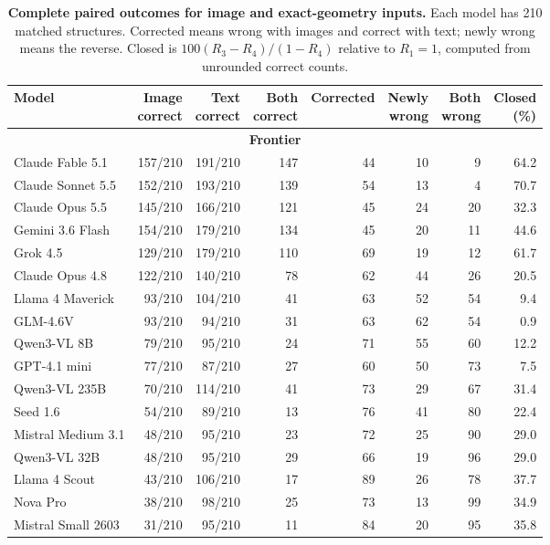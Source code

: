 \begin{table}[t]
\centering
\caption{\textbf{Complete paired outcomes for image and exact-geometry inputs.} Each model has 210 matched structures. Corrected means wrong with images and correct with text; newly wrong means the reverse. Closed is $100(R_3-R_4)/(1-R_4)$ relative to $R_1=1$, computed from unrounded correct counts.}
\label{tab:vlm_paired_counts}
\small
\setlength{\tabcolsep}{4pt}
\renewcommand{\arraystretch}{1.08}
\begin{tabular*}{\textwidth}{@{\extracolsep{\fill}}lrrrrrrr@{}}
\toprule
Model & \shortstack{Image\\correct} & \shortstack{Text\\correct} & \shortstack{Both\\correct} & Corrected & \shortstack{Newly\\wrong} & \shortstack{Both\\wrong} & \shortstack{Closed\\(\%)}\\
\midrule
\multicolumn{8}{c}{\textbf{Frontier}}\\
\midrule
Claude Fable 5.1 & 157/210 & 191/210 & 147 & 44 & 10 & 9 & 64.2\\
Claude Sonnet 5.5 & 152/210 & 193/210 & 139 & 54 & 13 & 4 & 70.7\\
Claude Opus 5.5 & 145/210 & 166/210 & 121 & 45 & 24 & 20 & 32.3\\
\midrule
Gemini 3.6 Flash & 154/210 & 179/210 & 134 & 45 & 20 & 11 & 44.6\\
Grok 4.5 & 129/210 & 179/210 & 110 & 69 & 19 & 12 & 61.7\\
Claude Opus 4.8 & 122/210 & 140/210 & 78 & 62 & 44 & 26 & 20.5\\
Llama 4 Maverick & 93/210 & 104/210 & 41 & 63 & 52 & 54 & 9.4\\
GLM-4.6V & 93/210 & 94/210 & 31 & 63 & 62 & 54 & 0.9\\
Qwen3-VL 8B & 79/210 & 95/210 & 24 & 71 & 55 & 60 & 12.2\\
GPT-4.1 mini & 77/210 & 87/210 & 27 & 60 & 50 & 73 & 7.5\\
Qwen3-VL 235B & 70/210 & 114/210 & 41 & 73 & 29 & 67 & 31.4\\
Seed 1.6 & 54/210 & 89/210 & 13 & 76 & 41 & 80 & 22.4\\
Mistral Medium 3.1 & 48/210 & 95/210 & 23 & 72 & 25 & 90 & 29.0\\
Qwen3-VL 32B & 48/210 & 95/210 & 29 & 66 & 19 & 96 & 29.0\\
Llama 4 Scout & 43/210 & 106/210 & 17 & 89 & 26 & 78 & 37.7\\
Nova Pro & 38/210 & 98/210 & 25 & 73 & 13 & 99 & 34.9\\
Mistral Small 2603 & 31/210 & 95/210 & 11 & 84 & 20 & 95 & 35.8\\
\bottomrule
\end{tabular*}
\end{table}
